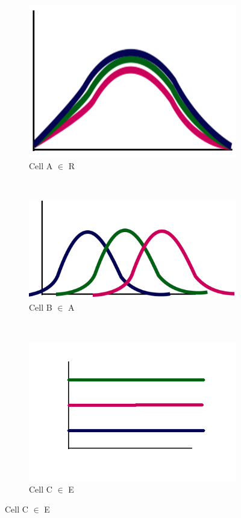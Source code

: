 \documentclass[a4paper, 12pt]{article}
\begin{document}
\begin{figure}[H]
	\centering
	\begin{subfigure}[b]{0.3\textwidth}
		\centering
		\includegraphics[width=\textwidth]{Cell-A.png}
		\caption{Cell A $\in$ R}
	\end{subfigure}%
	~
	\begin{subfigure}[b]{0.3\textwidth}
		\centering
		\includegraphics[width=\textwidth]{Cell-B.png}
		\caption{Cell B $\in$ A}
	\end{subfigure}
	~ 
	\begin{subfigure}[b]{0.3\textwidth}
		\centering
		\includegraphics[width=\textwidth]{Cell-C.png}
		\caption{Cell C $\in$ E}
	\end{subfigure}
\end{figure}
\end{document}
